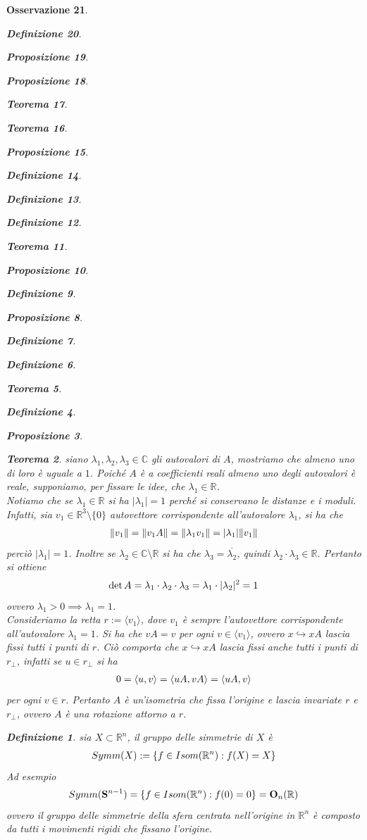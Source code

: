 \documentclass[oneside, 11pt]{amsbook}
\makeatletter
\newcommand{\0}{{(0)}}
\newcommand{\3}{{(3)}}
\theoremstyle{colonplain}
\newtheorem{thm}{Teorema}[chapter]
\newtheorem{prop}[thm]{Proposizione}
\theoremstyle{colondefinition}
\newtheorem{defn}[thm]{Definizione}
\theoremstyle{colonremark}
\newtheorem{rmk}[thm]{Osservazione}
\numberwithin{equation}{chapter}
\renewcommand{\proofname}{Dimostrazione}
\renewenvironment{proof}[1][\proofname]{\par
  \pushQED{\end{proof}}%
  \normalfont \topsep6\p@\@plus6\p@\relax
  \trivlist
  \item[\hskip\labelsep\bfseries #1:]\ignorespaces
}{%
  \popQED\endtrivlist\@endpefalse
}
\makeatother
\begin{document}
\begin{rmk}
\begin{defn}
\begin{prop}
\begin{prop}
\begin{thm}
\begin{thm}
\begin{prop}
\begin{defn}
\begin{defn}
\begin{defn}
\begin{thm}
\begin{prop}
\begin{defn}
\begin{prop}
\begin{defn}
\begin{defn}
\begin{thm}
\begin{defn}
\begin{prop}
\begin{thm}
\begin{proof} siano $\lambda_1, \lambda_2, \lambda_3 \in \mathbb{C}$ gli autovalori di $A$, mostriamo che almeno uno di loro è uguale a $1$. Poiché $A$ è a coefficienti reali almeno uno degli autovalori è reale, supponiamo, per fissare le idee, che $\lambda_1 \in \mathbb{R}$. \\
Notiamo che se $\lambda_1 \in \mathbb{R}$ si ha $|\lambda_1| = 1$ perché si conservano le distanze e i moduli. Infatti, sia $v_1 \in \mathbb{R}^3 \setminus \{ 0 \}$ autovettore corrispondente all'autovalore $\lambda_1$, si ha che
\begin{align}
    \| v_1 \| = \| v_1A \| = \| \lambda_1 v_1 \| = |\lambda_1|\| v_1 \| \notag
\end{align}
perciò $|\lambda_1| = 1$. Inoltre se $\lambda_2 \in \mathbb{C} \setminus \mathbb{R}$ si ha che $\lambda_3 = \overline{\lambda_2}$, quindi $\lambda_2 \cdot \lambda_3 \in \mathbb{R}$. Pertanto si ottiene
\begin{align}
    \det A = \lambda_1 \cdot \lambda_2 \cdot \lambda_3 = \lambda_1 \cdot |\lambda_2|^2 = 1 \notag
\end{align}
ovvero $\lambda_1 > 0 \implies \lambda_1 = 1$. \\
Consideriamo la retta $r := \langle v_1 \rangle$, dove $v_1$ è sempre l'autovettore corrispondente all'autovalore $\lambda_1 = 1$. Si ha che $vA = v$ per ogni $v \in \langle v_1 \rangle$, ovvero $x \hookrightarrow xA$ lascia fissi tutti i punti di $r$. Ciò comporta che $x \hookrightarrow xA$ lascia fissi anche tutti i punti di $r_\perp$, infatti se $u \in r_\perp$ si ha
\begin{align}
    0 = \langle u, v \rangle = \langle uA, vA \rangle = \langle uA, v \rangle \notag
\end{align}
per ogni $v \in r$. Pertanto $A$ è un'isometria che fissa l'origine e lascia invariate $r$ e $r_\perp$, ovvero $A$ è una rotazione attorno a $r$. \end{proof}
\begin{defn} sia $X \subset \mathbb{R}^n$, il \textit{gruppo delle simmetrie di $X$} è
\begin{align}
    Symm(X) := \{ f \in Isom(\mathbb{R}^n) : f(X) = X \} \notag
\end{align}
Ad esempio
\begin{align}
    Symm(\mathbf{S}^{n - 1}) = \{ f \in Isom(\mathbb{R}^n) : f(0) = 0 \} = \mathbf{O}_n(\mathbb{R}) \notag
\end{align}
ovvero il gruppo delle simmetrie della sfera centrata nell'origine in $\mathbb{R}^n$ è composto da tutti i movimenti rigidi che fissano l'origine. \\ \\

\end{defn}
\end{thm}
\end{prop}
\end{defn}
\end{thm}
\end{defn}
\end{defn}
\end{prop}
\end{defn}
\end{prop}
\end{thm}
\end{defn}
\end{defn}
\end{defn}
\end{prop}
\end{thm}
\end{thm}
\end{prop}
\end{prop}
\end{defn}
\end{rmk}
\end{document}

